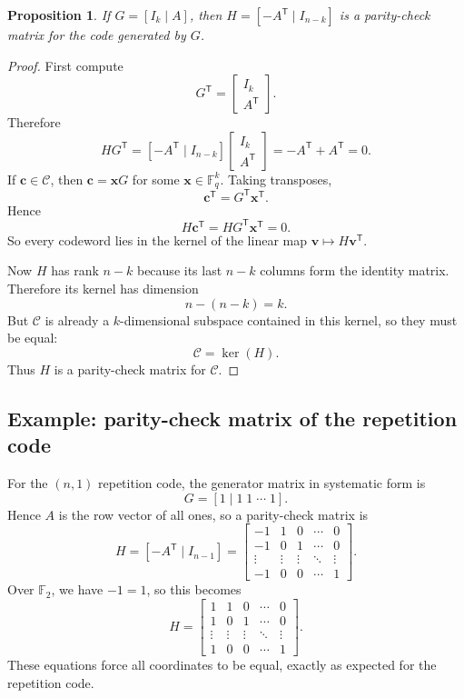 \documentclass[11pt]{article}
\newtheorem{proposition}[definition]{Proposition}
\newcommand{\F}{\mathbb{F}}
\newcommand{\code}{\mathcal{C}}
\newcommand{\vect}[1]{\bm{#1}}
\newcommand{\transpose}{^{\mathsf T}}
\begin{document}
\begin{proposition}
If \(G=[I_k\mid A]\), then \(H=[-A\transpose\mid I_{n-k}]\) is a parity-check matrix for the code generated by \(G\).
\end{proposition}

\begin{proof}
First compute
\[
G\transpose=
\begin{bmatrix}
I_k\\
A\transpose
\end{bmatrix}.
\]
Therefore
\[
HG\transpose = [-A\transpose\mid I_{n-k}]
\begin{bmatrix}
I_k\\
A\transpose
\end{bmatrix}
= -A\transpose + A\transpose = 0.
\]
If \(\vect{c}\in \code\), then \(\vect{c}=\vect{x}G\) for some \(\vect{x}\in \F_q^k\). Taking transposes,
\[
\vect{c}\transpose = G\transpose\vect{x}\transpose.
\]
Hence
\[
H\vect{c}\transpose = HG\transpose\vect{x}\transpose = 0.
\]
So every codeword lies in the kernel of the linear map \(\vect v\mapsto H\vect v\transpose\).

Now \(H\) has rank \(n-k\) because its last \(n-k\) columns form the identity matrix. Therefore its kernel has dimension
\[
n-(n-k)=k.
\]
But \(\code\) is already a \(k\)-dimensional subspace contained in this kernel, so they must be equal:
\[
\code = \ker(H).
\]
Thus \(H\) is a parity-check matrix for \(\code\).
\end{proof}

\subsection{Example: parity-check matrix of the repetition code}

For the \((n,1)\) repetition code, the generator matrix in systematic form is
\[
G=[1\mid 1\;1\;\cdots\;1].
\]
Hence \(A\) is the row vector of all ones, so a parity-check matrix is
\[
H=[-A\transpose\mid I_{n-1}]
=
\begin{bmatrix}
-1 & 1 & 0 & \cdots & 0 \\
-1 & 0 & 1 & \cdots & 0 \\
\vdots & \vdots & \vdots & \ddots & \vdots \\
-1 & 0 & 0 & \cdots & 1
\end{bmatrix}.
\]
Over \(\F_2\), we have \(-1=1\), so this becomes
\[
H=
\begin{bmatrix}
1 & 1 & 0 & \cdots & 0 \\
1 & 0 & 1 & \cdots & 0 \\
\vdots & \vdots & \vdots & \ddots & \vdots \\
1 & 0 & 0 & \cdots & 1
\end{bmatrix}.
\]
These equations force all coordinates to be equal, exactly as expected for the repetition code.
\end{document}
